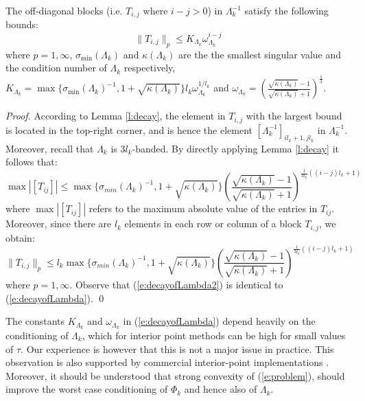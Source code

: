 \begin{proposition} \label{p:decayofLambda}
The off-diagonal blocks (i.e. $T_{i,j}$ where $i - j > 0$) in $\Lambda_k^{-1}$ satisfy the following bounds:
\begin{equation} \label{e:decayofLambda}
\| T_{i,j} \|_p \leq K_{\Lambda_k} \omega_{\Lambda_k}^{i - j}
\end{equation}
where $p= 1,\infty$, $\sigma_{\min}(\Lambda_k)$ and $\kappa(\Lambda_k)$ are the the smallest singular value and the condition number of $\Lambda_k$ respectively, $K_{\Lambda_k} = \max \{ \sigma_{\min}(\Lambda_k)^{-1}, 1 + \sqrt{\kappa(\Lambda_k)} \} l_k \omega_{\Lambda_k}^{1/l_k}$ and $\omega_{\Lambda_k} = \left( \frac{\sqrt{\kappa(\Lambda_k)} - 1}{\sqrt{\kappa(\Lambda_k)} + 1} \right)^{\frac{1}{3}}$.
\end{proposition}
\begin{proof}
According to Lemma \ref{l:decay}, the element in $T_{i,j}$ with the largest bound is located in the top-right corner, and is hence the element $[\Lambda_k^{-1}]_{i l_k + 1, j l_k}$ in $\Lambda_k^{-1}$. Moreover, recall that $\Lambda_k$ is $3 l_k$-banded. By directly applying Lemma \ref{l:decay} it follows that:
\begin{equation}
\max \left| [ T_{ij} ] \right| \leq \max \{ \sigma_{min}(\Lambda_k)^{-1}, 1 +  \sqrt{\kappa(\Lambda_k)} \} \left( \frac{ \sqrt{\kappa(\Lambda_k)} - 1}{ \sqrt{\kappa(\Lambda_k)} + 1} \right)^{\frac{1}{3l_k}((i - j)l_k + 1)}
\end{equation}
where $\max \left| [ T_{ij} ] \right| $ refers to the maximum absolute value of the entries in $T_{ij}$. Moreover, since there are $l_k$ elements in each row or column of a block $T_{i,j}$, we obtain:
\begin{equation} \label{e:decayofLambda2}
\| T_{i,j} \|_p \leq l_k \max \{ \sigma_{min}(\Lambda_k)^{-1}, 1 +  \sqrt{\kappa(\Lambda_k)} \} \left( \frac{ \sqrt{\kappa(\Lambda_k)} - 1}{ \sqrt{\kappa(\Lambda_k)} + 1} \right)^{\frac{1}{3l_k}((i - j)l_k + 1)}
\end{equation}
where $p=1,\infty$. Observe that (\ref{e:decayofLambda2}) is identical to (\ref{e:decayofLambda}).
\qed
\end{proof}
\begin{remark}
The constants $K_{\Lambda_k}$ and $\omega_{\Lambda_k}$ in (\ref{e:decayofLambda}) depend heavily on the conditioning of $\Lambda_k$, which for interior point methods can be high for small values of $\tau$. Our experience is however that this is not a major issue in practice. This observation is also supported by commercial interior-point implementations \cite{WrightM1998} \cite{Domahidi2012}. Moreover, it should be understood that strong convexity of (\ref{e:problem}), should improve the worst case conditioning of $\Phi_k$ and hence also of $\Lambda_k$.
\end{remark}


